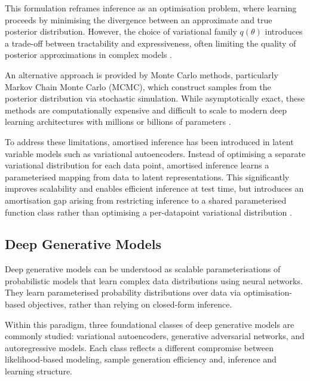\documentclass[a4paper,twoside,12pt]{report}
\begin{document}
This formulation reframes inference as an optimisation problem, where learning proceeds by minimising the divergence between an approximate and true posterior distribution. However, the choice of variational family \(q(\theta)\) introduces a trade-off between tractability and expressiveness, often limiting the quality of posterior approximations in complex models \citep{blei2017variational}.

An alternative approach is provided by Monte Carlo methods, particularly Markov Chain Monte Carlo (MCMC), which construct samples from the posterior distribution via stochastic simulation. While asymptotically exact, these methods are computationally expensive and difficult to scale to modern deep learning architectures with millions or billions of parameters \citep{neal2011mcmc, robert2004montecarlo}.

To address these limitations, amortised inference has been introduced in latent variable models such as variational autoencoders. Instead of optimising a separate variational distribution for each data point, amortised inference learns a parameterised mapping from data to latent representations. This significantly improves scalability and enables efficient inference at test time, but introduces an amortisation gap arising from restricting inference to a shared parameterised function class rather than optimising a per-datapoint variational distribution \citep{kingma2013auto, rezende2014stochastic, margossianblei2023amortized}.




\subsection{Deep Generative Models}

Deep generative models can be understood as scalable parameterisations of probabilistic models that learn complex data distributions using neural networks. They learn parameterised probability distributions over data via optimisation-based objectives, rather than relying on closed-form inference.

Within this paradigm, three foundational classes of deep generative models are commonly studied: variational autoencoders, generative adversarial networks, and autoregressive models. Each class reflects a different compromise between likelihood-based modeling, sample generation efficiency and, inference and learning structure.
\end{document}
